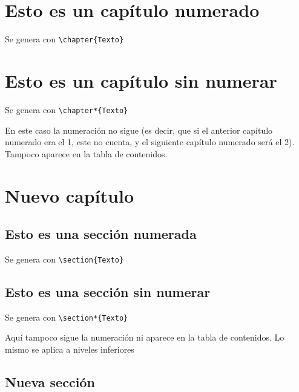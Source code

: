 \chapter{Esto es un capítulo numerado}

Se genera con \verb!\chapter{Texto}!

\chapter*{Esto es un capítulo sin numerar}

Se genera con \verb!\chapter*{Texto}!

En este caso la numeración no sigue (es decir, que si el anterior capítulo numerado era el 1, este no cuenta, y el siguiente capítulo numerado será el 2). Tampoco aparece en la tabla de contenidos.

\chapter{Nuevo capítulo}

\section{Esto es una sección numerada}

Se genera con \verb!\section{Texto}!

\section*{Esto es una sección sin numerar}

Se genera con \verb!\section*{Texto}!

Aquí tampoco sigue la numeración ni aparece en la tabla de contenidos. Lo mismo se aplica a niveles inferiores

\section{Nueva sección}

